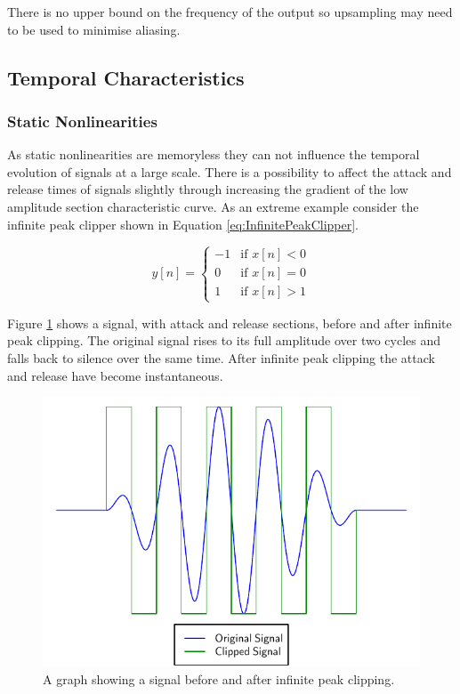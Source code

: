 			There is no upper bound on the frequency of the output so upsampling may need to be used to
			minimise aliasing.

	\subsection{Temporal Characteristics}
	\label{sec:ExcitationEvaluation-Comparison-TemporalCharacteristics}
		\subsubsection*{Static Nonlinearities}
			As static nonlinearities are memoryless they can not influence the temporal evolution of signals at
			a large scale. There is a possibility to affect the attack and release times of signals slightly
			through increasing the gradient of the low amplitude section characteristic curve. As an extreme
			example consider the infinite peak clipper shown in Equation \ref{eq:InfinitePeakClipper}.

			\begin{equation}
				y[n] = \begin{cases}
					-1 & \text{if $x[n] < 0$} \\
					0 & \text{if $x[n] = 0$} \\
					1 & \text{if $x[n] > 1$}
				\end{cases}
				\label{eq:InfinitePeakClipper}
			\end{equation}
			
			Figure \ref{fig:InfinitePeakClipping} shows a signal, with attack and release sections, before and
			after infinite peak clipping. The original signal rises to its full amplitude over two cycles and
			falls back to silence over the same time. After infinite peak clipping the attack and release have
			become instantaneous.

			\begin{figure}[h!]
				\centering
				\includegraphics{chapter5/Images/InfinitePeakClipping.pdf}
				\caption{A graph showing a signal before and after infinite peak clipping.}
				\label{fig:InfinitePeakClipping}
			\end{figure}

